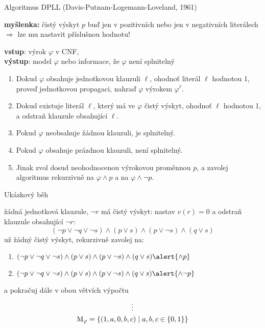 \documentclass{beamer}
\begin{document}
\begin{frame}{Algoritmus DPLL (Davis-Putnam-Logemann-Loveland, 1961)}

    \textbf{myšlenka:} \alert{čistý výskyt} $p$  buď jen v pozitivních nebo jen v negativních literálech $\Rightarrow$ lze mu nastavit příslušnou hodnotu!

    \textbf{vstup}: výrok $\varphi$ v CNF,\\ 
    \textbf{výstup}: model $\varphi$ nebo informace, že  $\varphi$ není splnitelný
    \begin{enumerate}                
        \item Dokud $\varphi$ obsahuje jednotkovou klauzuli $\ell$, ohodnoť literál $\ell$ hodnotou 1, proveď \alert{jednotkovou propagaci}, nahraď $\varphi$ výrokem $\varphi^\ell$.
         \item Dokud existuje literál $\ell$, který má ve $\varphi$ \alert{čistý výskyt}, ohodnoť $\ell$ hodnotou 1, a odstraň klauzule obsahující $\ell$.
        \item Pokud $\varphi$ neobsahuje žádnou klauzuli, je splnitelný.
        \item Pokud $\varphi$ obsahuje prázdnou klauzuli, není splnitelný.
        \item Jinak zvol dosud neohodnocenou výrokovou proměnnou $p$, a \alert{zavolej algoritmus rekurzivně} na $\varphi\land p$ a na $\varphi\land \neg p$.
    \end{enumerate}

\end{frame}


\begin{frame}{Ukázkový běh}

    
    žádná jednotková klauzule, $\neg r$ má \alert{čistý výskyt}: nastav  $v(r)=0$ a odstraň klauzule obsahující $\neg r$:
    $$
    (\neg p\lor\neg q\lor\neg s)\land (p\lor s)\land(p\lor\neg s)\land(q\lor s)
    $$
    už žádný čistý výskyt, rekurzivně zavolej na:
    \begin{enumerate}
        \item $(\neg p\lor\neg q\lor\neg s)\land (p\lor s)\land(p\lor\neg s)\land(q\lor s)\alert{\land p}$
        \item $(\neg p\lor\neg q\lor\neg s)\land (p\lor s)\land(p\lor\neg s)\land(q\lor s)\alert{\land \neg p}$
    \end{enumerate}
    a pokračuj dále v obou větvích výpočtu
    \begin{gather*}
        \vdots \\
        \operatorname{M}_\varphi=\{(1,a,0,b,c)\mid a,b,c\in\{0,1\}\}
    \end{gather*}
    
\end{frame}
\end{document}
